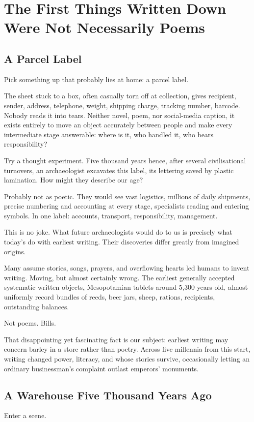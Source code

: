 \chapter[Writing Began with More Than Poems]{The First Things Written Down Were Not Necessarily Poems}
\section{A Parcel Label}
Pick something up that probably lies at home: a parcel label.

The sheet stuck to a box, often casually torn off at collection, gives recipient, sender, address, telephone, weight, shipping charge, tracking number, barcode. Nobody reads it into tears. Neither novel, poem, nor social-media caption, it exists entirely to move an object accurately between people and make every intermediate stage answerable: where is it, who handled it, who bears responsibility?

Try a thought experiment. Five thousand years hence, after several civilisational turnovers, an archaeologist excavates this label, its lettering saved by plastic lamination. How might they describe our age?

Probably not as poetic. They would see vast logistics, millions of daily shipments, precise numbering and accounting at every stage, specialists reading and entering symbols. In one label: accounts, transport, responsibility, management.

This is no joke. What future archaeologists would do to us is precisely what today's do with earliest writing. Their discoveries differ greatly from imagined origins.

Many assume stories, songs, prayers, and overflowing hearts led humans to invent writing. Moving, but almost certainly wrong. The earliest generally accepted systematic written objects, Mesopotamian tablets around 5,300 years old, almost uniformly record bundles of reeds, beer jars, sheep, rations, recipients, outstanding balances.

Not poems. Bills.

That disappointing yet fascinating fact is our subject: earliest writing may concern barley in a store rather than poetry. Across five millennia from this start, writing changed power, literacy, and whose stories survive, occasionally letting an ordinary businessman's complaint outlast emperors' monuments.

\section{A Warehouse Five Thousand Years Ago}
Enter a scene.

